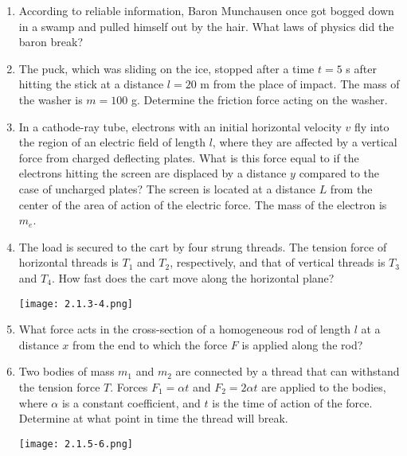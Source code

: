 \documentclass{article}
\begin{document}
\begin{enumerate}[label=2.1.\arabic*]


\item According to reliable information, Baron Munchausen once got bogged down in a swamp and pulled himself out by the hair. What laws of physics did the baron break?

\item The puck, which was sliding on the ice, stopped after a time $t = 5$ s after hitting the stick at a distance $l = 20$ m from the place of impact. The mass of the washer is $m = 100$ g. Determine the friction force acting on the washer.

\item In a cathode-ray tube, electrons with an initial horizontal velocity $v$ fly into the region of an electric field of length $l$, where they are affected by a vertical force from charged deflecting plates. What is this force equal to if the electrons hitting the screen are displaced by a distance $y$ compared to the case of uncharged plates? The screen is located at a distance $L$ from the center of the area of action of the electric force. The mass of the electron is $m_e$.

\item The load is secured to the cart by four strung threads. The tension force of horizontal threads is $T_1$ and $T_2$, respectively, and that of vertical threads is $T_3$ and $T_4$. How fast does the cart move along the horizontal plane?

\begin{center}
    \texttt{[image: 2.1.3-4.png]}
\end{center}

\item What force acts in the cross-section of a homogeneous rod of length $l$ at a distance $x$ from the end to which the force $F$ is applied along the rod?

\item Two bodies of mass $m_1$ and $m_2$ are connected by a thread that can withstand the tension force $T$. Forces $F_1 = \alpha t$ and $F_2 = 2 \alpha t$ are applied to the bodies, where $\alpha$ is a constant coefficient, and $t$ is the time of action of the force. Determine at what point in time the thread will break.

\begin{center}
    \texttt{[image: 2.1.5-6.png]}
\end{center}


\end{enumerate}
\end{document}
